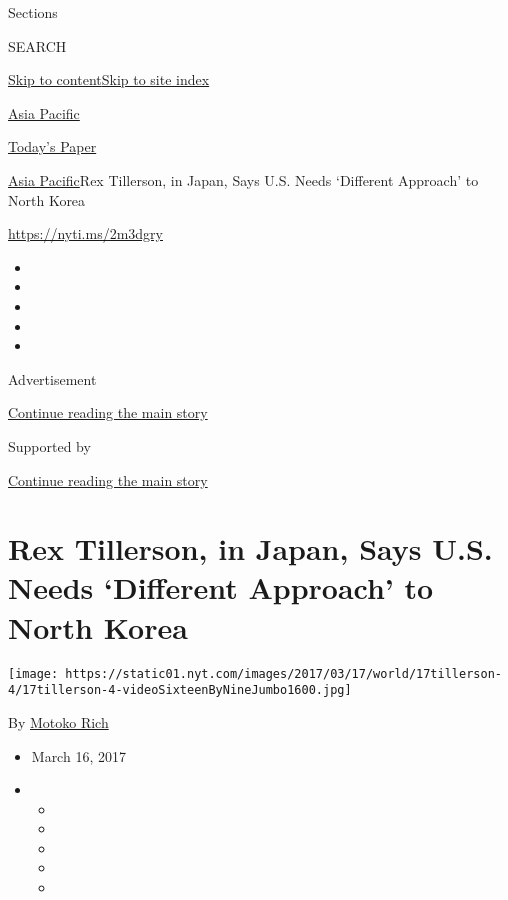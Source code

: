 Sections

SEARCH

\protect\hyperlink{site-content}{Skip to
content}\protect\hyperlink{site-index}{Skip to site index}

\href{https://www.nytimes.com/section/world/asia}{Asia Pacific}

\href{https://myaccount.nytimes.com/auth/login?response_type=cookie\&client_id=vi}{}

\href{https://www.nytimes.com/section/todayspaper}{Today's Paper}

\href{/section/world/asia}{Asia Pacific}\textbar{}Rex Tillerson, in
Japan, Says U.S. Needs `Different Approach' to North Korea

\url{https://nyti.ms/2m3dgry}

\begin{itemize}
\item
\item
\item
\item
\item
\end{itemize}

Advertisement

\protect\hyperlink{after-top}{Continue reading the main story}

Supported by

\protect\hyperlink{after-sponsor}{Continue reading the main story}

\hypertarget{rex-tillerson-in-japan-says-us-needs-different-approach-to-north-korea}{%
\section{Rex Tillerson, in Japan, Says U.S. Needs `Different Approach'
to North
Korea}\label{rex-tillerson-in-japan-says-us-needs-different-approach-to-north-korea}}

\texttt{[image: https://static01.nyt.com/images/2017/03/17/world/17tillerson-4/17tillerson-4-videoSixteenByNineJumbo1600.jpg]}

By \href{http://www.nytimes.com/by/motoko-rich}{Motoko Rich}

\begin{itemize}
\item
  March 16, 2017
\item
  \begin{itemize}
  \item
  \item
  \item
  \item
  \item
  \end{itemize}
\end{itemize}

